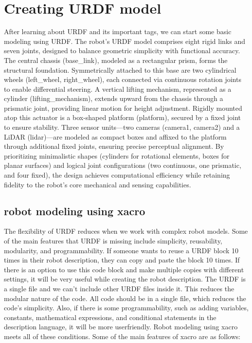 \documentclass[../../main]{subfiles}
\begin{document}
\section{Creating URDF model}
After learning about URDF and its important tags, we can start some basic modeling
using URDF.
The robot’s URDF model comprises eight rigid links and seven joints,
designed to balance geometric simplicity with functional accuracy. 
The central chassis (base\_link), modeled as a rectangular prism, 
forms the structural foundation. 
Symmetrically attached to this base are two cylindrical wheels 
(left\_wheel, right\_wheel), each connected via continuous rotation 
joints to enable differential steering. A vertical lifting mechanism, 
represented as a cylinder (lifting\_mechanism), extends upward from the 
chassis through a prismatic joint, providing linear motion for height adjustment. 
Rigidly mounted atop this actuator is a box-shaped platform (platform), 
secured by a fixed joint to ensure stability. Three sensor units—two cameras 
(camera1, camera2) and a LiDAR (lidar)—are modeled as compact boxes and affixed 
to the platform through additional fixed joints, ensuring precise perceptual alignment. 
By prioritizing minimalistic shapes (cylinders for rotational elements, boxes for planar surfaces) 
and logical joint configurations (two continuous, one prismatic, and four fixed), the design achieves 
computational efficiency while retaining fidelity to the robot’s core mechanical and sensing capabilities.

\subsection{robot modeling using xacro}
The flexibility of URDF reduces when we work with complex robot models. Some of
the main features that URDF is missing include simplicity, reusability, modularity, and
programmability.
If someone wants to reuse a URDF block 10 times in their robot description, they can
copy and paste the block 10 times. If there is an option to use this code block and make
multiple copies with different settings, it will be very useful while creating the robot
description.
The URDF is a single file and we can't include other URDF files inside it. This reduces the
modular nature of the code. All code should be in a single file, which reduces the code's
simplicity.
Also, if there is some programmability, such as adding variables, constants, mathematical
expressions, and conditional statements in the description language, it will be more userfriendly.
Robot modeling using xacro meets all of these conditions. Some of the main features of
xacro are as follows:
\end{document}
